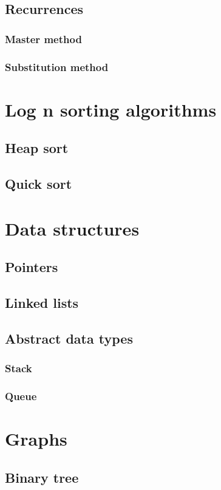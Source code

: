 \documentclass{article}
\begin{document}
	\subsection{Recurrences}
		\subsubsection{Master method}
		\subsubsection{Substitution method}


\section{Log n sorting algorithms}
	\subsection{Heap sort}
	\subsection{Quick sort}

\section{Data structures}
	\subsection{Pointers}
	\subsection{Linked lists}
	\subsection{Abstract data types}
		\subsubsection{Stack}
		\subsubsection{Queue}

\section{Graphs}
	\subsection{Binary tree}
\end{document}
